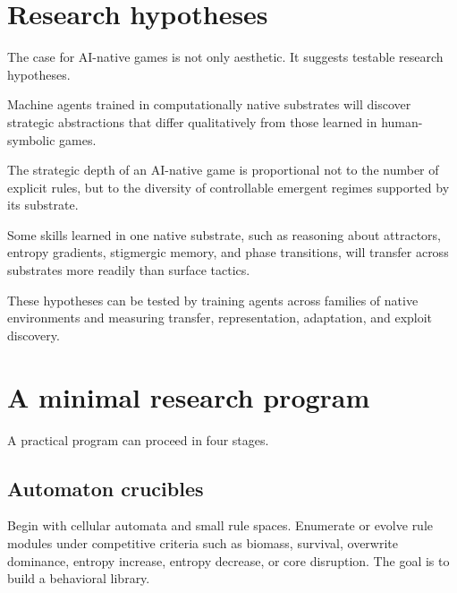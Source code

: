 \section{Research hypotheses}\label{sec:hypotheses}

The case for AI-native games is not only aesthetic. It suggests testable research hypotheses.

\begin{hypothesis}\label{hyp:native-strategy}
Machine agents trained in computationally native substrates will discover strategic abstractions that differ qualitatively from those learned in human-symbolic games.
\end{hypothesis}

\begin{hypothesis}\label{hyp:substrate-richness}
The strategic depth of an AI-native game is proportional not to the number of explicit rules, but to the diversity of controllable emergent regimes supported by its substrate.
\end{hypothesis}

\begin{hypothesis}\label{hyp:transfer}
Some skills learned in one native substrate, such as reasoning about attractors, entropy gradients, stigmergic memory, and phase transitions, will transfer across substrates more readily than surface tactics.
\end{hypothesis}

These hypotheses can be tested by training agents across families of native environments and measuring transfer, representation, adaptation, and exploit discovery.

\section{A minimal research program}\label{sec:program}

A practical program can proceed in four stages.

\subsection{Automaton crucibles}

Begin with cellular automata and small rule spaces. Enumerate or evolve rule modules under competitive criteria such as biomass, survival, overwrite dominance, entropy increase, entropy decrease, or core disruption. The goal is to build a behavioral library.


